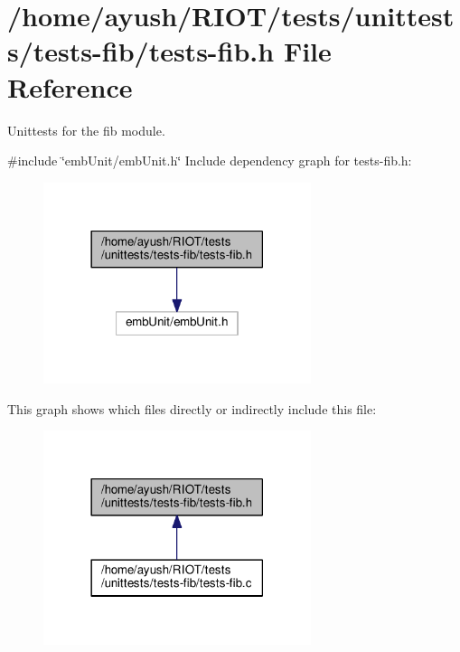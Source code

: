 \hypertarget{tests-fib_8h}{}\section{/home/ayush/\+R\+I\+O\+T/tests/unittests/tests-\/fib/tests-\/fib.h File Reference}
\label{tests-fib_8h}


Unittests for the {\ttfamily fib} module.  


{\ttfamily \#include \char`\"{}emb\+Unit/emb\+Unit.\+h\char`\"{}}\newline
Include dependency graph for tests-\/fib.h\+:
\nopagebreak
\begin{figure}[H]
\begin{center}
\leavevmode
\includegraphics[width=222pt]{tests-fib_8h__incl}
\end{center}
\end{figure}
This graph shows which files directly or indirectly include this file\+:
\nopagebreak
\begin{figure}[H]
\begin{center}
\leavevmode
\includegraphics[width=222pt]{tests-fib_8h__dep__incl}
\end{center}
\end{figure}
